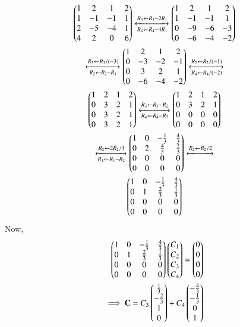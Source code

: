 \documentclass[journal,12pt,twocolumn]{IEEEtran}
\begin{document}
\begin{multline}
\begin{pmatrix}1 & 2 & 1 & 2\\1 & -1 & -1 & 1\\2 & -5 & -4 & 1\\4 & 2 & 0 & 6\end{pmatrix} \xleftrightarrow[R_4\leftarrow R_4 - 4R_1]{R_3\leftarrow R_3-2R_1}\begin{pmatrix}1 & 2 & 1 & 2\\1 & -1 & -1 & 1\\0 & -9 & -6 & -3\\0 & -6 & -4 & -2\end{pmatrix}\\
\xleftrightarrow[R_2\leftarrow R_2 - R_1]{R_3\leftarrow R_3/(-3)}\begin{pmatrix}1 & 2 & 1 & 2\\0 & -3 & -2 & -1\\0 & 3 & 2 & 1\\0 & -6 & -4 & -2\end{pmatrix}\xleftrightarrow[R_4\leftarrow R_4/(-2)]{R_2\leftarrow R_2/(-1)}\\
\begin{pmatrix}1 & 2 & 1 & 2\\0 & 3 & 2 & 1\\0 & 3 & 2 & 1\\0 & 3 & 2 & 1\end{pmatrix}\xleftrightarrow[R_4\leftarrow R_4-R_2]{R_3\leftarrow R_3-R_2}\begin{pmatrix}1 & 2 & 1 & 2\\0 & 3 & 2 & 1\\0 & 0 & 0 & 0\\0 & 0 & 0 & 0\end{pmatrix}\\
\xleftrightarrow[R_1\leftarrow R_1-R_2]{R_2\leftarrow 2R_2/3}\begin{pmatrix}1 & 0 & -\frac{1}{3} & \frac{4}{3}\\0 & 2 & \frac{4}{3} & \frac{2}{3}\\0 & 0 & 0 & 0\\0 & 0 & 0 & 0\end{pmatrix}\xleftrightarrow[]{R_2\leftarrow R_2/2}\\
\begin{pmatrix}1 & 0 & -\frac{1}{3} & \frac{4}{3}\\0 & 1 & \frac{2}{3} & \frac{1}{3}\\0 & 0 & 0 & 0\\0 & 0 & 0 & 0\end{pmatrix}
\end{multline}
Now, 
\begin{align}
\begin{pmatrix}1 & 0 & -\frac{1}{3} & \frac{4}{3}\\0 & 1 & \frac{2}{3} & \frac{1}{3}\\0 & 0 & 0 & 0\\0 & 0 & 0 & 0\end{pmatrix} \begin{pmatrix}C_1\\C_2\\C_3\\C_4\end{pmatrix} = \begin{pmatrix}0\\0\\0\\0\end{pmatrix}\\
\implies \mathbf{C} = C_3 \begin{pmatrix}\frac{1}{3}\\-\frac{2}{3}\\1\\0\end{pmatrix} +C_4 \begin{pmatrix}-\frac{4}{3}\\-\frac{1}{3}\\0\\1\end{pmatrix}
\end{align}
\end{document}
